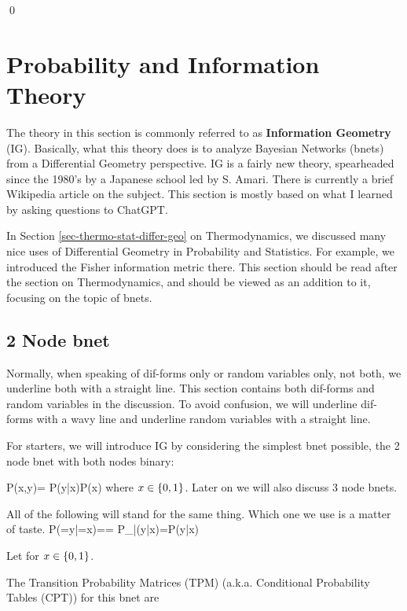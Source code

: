 \qed


\section{Probability and Information Theory}

The theory in this section is commonly referred to as {\bf Information Geometry} (IG).
Basically, what this theory does is to analyze Bayesian Networks (bnets)
from a Differential Geometry perspective.
IG is a fairly new theory,
spearheaded since the 1980's by a Japanese school led by S. Amari.
There is currently 
a brief Wikipedia article  %
on the subject.
This section is mostly based
on what I learned by asking questions to ChatGPT.

In Section \ref{sec-thermo-stat-differ-geo}
on Thermodynamics, we discussed many 
nice uses of Differential Geometry in Probability and Statistics.
For example, we introduced 
the Fisher information metric there.
This section should 
be read after the section on Thermodynamics, and should be viewed as an addition to it, focusing on the topic of bnets.


\subsection{2 Node bnet}

Normally, when speaking of dif-forms  only or random variables only,
not both, we underline both with a straight line. 
This section contains  both dif-forms and random variables in the discussion. To avoid confusion,
we will underline 
dif-forms with a wavy line
and 
underline random variables with a straight line.


For starters, we will
introduce IG by considering the simplest bnet possible, the 2 node bnet with both nodes binary:

\beq 
{}
\quad\quad
P(x,y)= P(y|x)P(x)
\eeq
where $x\in \{0,1\}$.
Later on we will also discuss 3 node bnets.

All of the following will
stand for the same thing.
Which one we use is a matter of taste.
\beq
P(\rvy=y|\rvx=x)==
P_{\rvy|\rvx}(y|x)=P(y|x)
\eeq

Let
\beq
{}
\eeq
for $x\in \{0,1\}$.

The Transition Probability Matrices (TPM)
(a.k.a. Conditional Probability Tables (CPT))
for this bnet are




